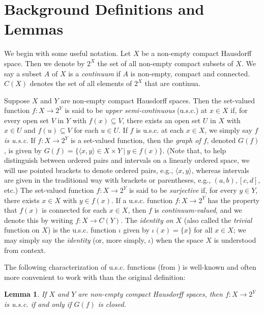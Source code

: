 \documentclass{amsart}
\newtheorem{lemma}[theorem]{Lemma}
\theoremstyle{definition}
\begin{document}
\section{Background Definitions and Lemmas}

We begin with some useful notation. Let $X$ be a non-empty compact Hausdorff space. Then we denote by $2^X$ the set of all non-empty compact subsets of $X$. We say a subset $A$ of $X$ is a \emph{continuum} if $A$ is non-empty, compact and connected. $C(X)$ denotes the set of all elements of $2^X$ that are continua.

Suppose $X$ and $Y$ are non-empty compact Hausdorff spaces. Then the set-valued function $f: X \rightarrow 2^{Y}$ is said to be \emph{upper semi-continuous} (u.s.c.) at $x \in X$ if, for every open set $V$ in $Y$ with $f(x) \subseteq V$, there exists an open set $U$ in $X$ with $x \in U$ and $f(u) \subseteq V$ for each $u \in U$. If $f$ is u.s.c. at each $x \in X$, we simply say \emph{$f$ is u.s.c.} If $f: X \rightarrow 2^{Y}$ is a set-valued function, then the \emph{graph of $f$}, denoted $G(f)$, is given by $G(f) = \{\langle x , y \rangle \in X \times Y \ | \ y \in f(x)\}$. (Note that, to help distinguish between ordered pairs and intervals on a linearly ordered space, we will use pointed brackets to denote ordered pairs, e.g., $\langle x , y \rangle$, whereas intervals are given in the traditional way with brackets or parentheses, e.g., $(a,b), [c,d]$, etc.) The set-valued function $f: X \rightarrow 2^{Y}$ is said to be \emph{surjective} if, for every $y \in Y$, there exists $x \in X$ with $y \in f(x)$. If a u.s.c. function $f: X \rightarrow 2^{Y}$ has the property that $f(x)$ is connected for each $x \in X$, then $f$ is \emph{continuum-valued}, and we denote this by writing  $f: X \rightarrow C(Y).$ The \emph{identity on} $X$ (also called the \emph{trivial} function on $X$) is the u.s.c. function $\iota$ given by $\iota(x) = \{x\}$ for all $x \in X$; we may simply say the \emph{identity} (or, more simply, $\iota$) when the space $X$ is understood from context.

The following characterization of u.s.c. functions (from \cite{i m paper}) is well-known and often more convenient to work with than the original definition:

\begin{lemma} If $X$ and $Y$ are non-empty compact Hausdorff spaces, then $f: X \rightarrow 2^{Y}$ is u.s.c. if and only if $G(f)$ is closed.
\end{lemma}
\end{document}
